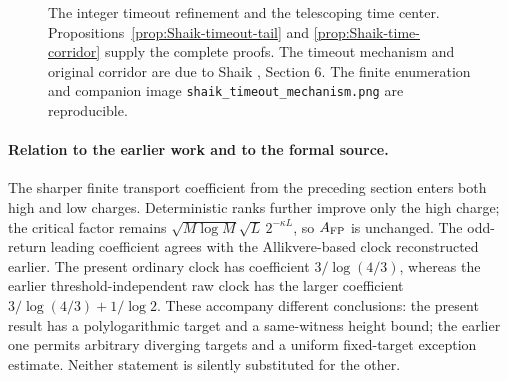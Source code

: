 \begin{figure}[ht]
\centering
{}
\caption{The integer timeout refinement and the telescoping time center.
Propositions~\ref{prop:Shaik-timeout-tail} and
\ref{prop:Shaik-time-corridor} supply the complete proofs.
The timeout mechanism and original corridor are due to Shaik
\cite{Shaik2026v324}, Section 6. The finite enumeration and companion
image \texttt{shaik\_timeout\_mechanism.png} are reproducible.}
\end{figure}

\paragraph{Relation to the earlier work and to the formal source.}
The sharper finite transport coefficient from the preceding section
enters both high and low charges. Deterministic ranks further improve
only the high charge; the critical factor remains
\(\sqrt{M\log M}\sqrt L\,2^{-\kappa L}\), so \(A_{\rm FP}\) is unchanged.
The odd-return leading coefficient agrees with the Allikvere-based
clock reconstructed earlier. The present ordinary clock has coefficient
\(3/\log(4/3)\), whereas the earlier threshold-independent raw clock
has the larger coefficient \(3/\log(4/3)+1/\log2\).
These accompany different conclusions: the present result has a
polylogarithmic target and a same-witness height bound; the earlier
one permits arbitrary diverging targets and a uniform fixed-target
exception estimate. Neither statement is silently substituted for the other.

